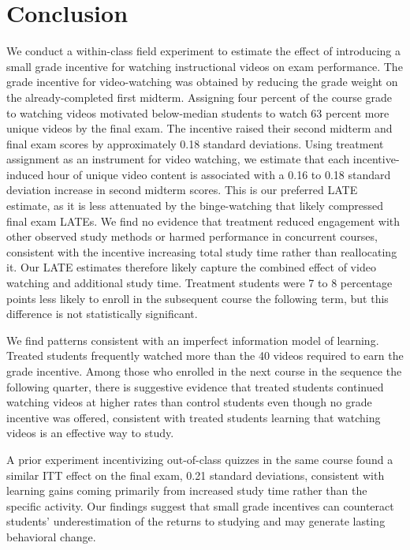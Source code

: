 \section{Conclusion} \label{sec:conclusion}

We conduct a within-class field experiment to estimate the effect of introducing a small grade incentive for watching instructional videos on exam performance.  
The grade incentive for video-watching was obtained by reducing the grade weight on the already-completed first midterm.
Assigning four percent of the course grade to watching videos motivated below-median students to watch 63 percent more unique videos by the final exam.
The incentive raised their second midterm and final exam scores by approximately 0.18 standard deviations.
Using treatment assignment as an instrument for video watching, we estimate that each incentive-induced hour of unique video content is associated with a 0.16 to 0.18 standard deviation increase in second midterm scores.
This is our preferred LATE estimate, as it is less attenuated by the binge-watching that likely compressed final exam LATEs.
We find no evidence that treatment reduced engagement with other observed study methods or harmed performance in concurrent courses, consistent with the incentive increasing total study time rather than reallocating it.
Our LATE estimates therefore likely capture the combined effect of video watching and additional study time.
Treatment students were 7 to 8 percentage points less likely to enroll in the subsequent course the following term, but this difference is not statistically significant.

We find patterns consistent with an imperfect information model of learning.
Treated students frequently watched more than the 40 videos required to earn the grade incentive.
Among those who enrolled in the next course in the sequence the following quarter, there is suggestive evidence that treated students continued watching videos at higher rates than control students even though no grade incentive was offered, consistent with treated students learning that watching videos is an effective way to study.

A prior experiment incentivizing out-of-class quizzes in the same course \parencite{afg2026} found a similar ITT effect on the final exam, 0.21 standard deviations, consistent with learning gains coming primarily from increased study time rather than the specific activity.
Our findings suggest that small grade incentives can counteract students' underestimation of the returns to studying and may generate lasting behavioral change.

